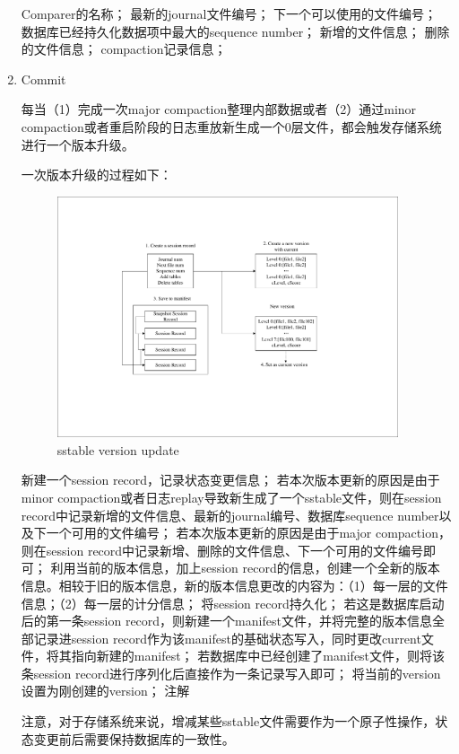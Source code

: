 \begin{enumerate}
Comparer的名称；
最新的journal文件编号；
下一个可以使用的文件编号；
数据库已经持久化数据项中最大的sequence number；
新增的文件信息；
删除的文件信息；
compaction记录信息；
		\item Commit

每当（1）完成一次major compaction整理内部数据或者（2）通过minor compaction或者重启阶段的日志重放新生成一个0层文件，都会触发存储系统进行一个版本升级。

一次版本升级的过程如下：
		
\begin{figure}[H]
	\centering
	\includegraphics[width=0.95\textwidth]{pdf/version_update.pdf}
	\caption{sstable version update}
	\label{sstable_version_update}
\end{figure}


新建一个session record，记录状态变更信息；
若本次版本更新的原因是由于minor compaction或者日志replay导致新生成了一个sstable文件，则在session record中记录新增的文件信息、最新的journal编号、数据库sequence number以及下一个可用的文件编号；
若本次版本更新的原因是由于major compaction，则在session record中记录新增、删除的文件信息、下一个可用的文件编号即可；
利用当前的版本信息，加上session record的信息，创建一个全新的版本信息。相较于旧的版本信息，新的版本信息更改的内容为：（1）每一层的文件信息；（2）每一层的计分信息；
将session record持久化；
若这是数据库启动后的第一条session record，则新建一个manifest文件，并将完整的版本信息全部记录进session record作为该manifest的基础状态写入，同时更改current文件，将其指向新建的manifest；
若数据库中已经创建了manifest文件，则将该条session record进行序列化后直接作为一条记录写入即可；
将当前的version设置为刚创建的version；
注解

注意，对于存储系统来说，增减某些sstable文件需要作为一个原子性操作，状态变更前后需要保持数据库的一致性。


\end{enumerate}
